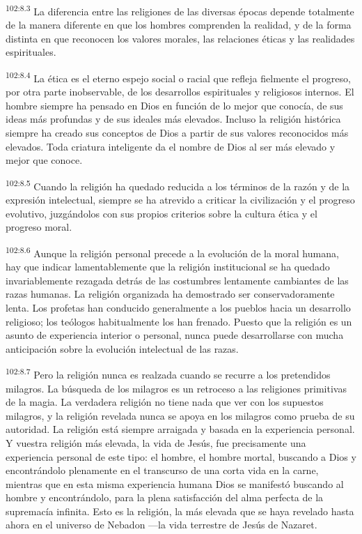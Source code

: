\documentclass[twoside, 11pt]{book}
\begin{document}
\par
\textsuperscript{102:8.3} La diferencia entre las religiones de las diversas épocas depende totalmente de la manera diferente en que los hombres comprenden la realidad, y de la forma distinta en que reconocen los valores morales, las relaciones éticas y las realidades espirituales.

\par
\textsuperscript{102:8.4} La ética es el eterno espejo social o racial que refleja fielmente el progreso, por otra parte inobservable, de los desarrollos espirituales y religiosos internos. El hombre siempre ha pensado en Dios en función de lo mejor que conocía, de sus ideas más profundas y de sus ideales más elevados. Incluso la religión histórica siempre ha creado sus conceptos de Dios a partir de sus valores reconocidos más elevados. Toda criatura inteligente da el nombre de Dios al ser más elevado y mejor que conoce.

\par
\textsuperscript{102:8.5} Cuando la religión ha quedado reducida a los términos de la razón y de la expresión intelectual, siempre se ha atrevido a criticar la civilización y el progreso evolutivo, juzgándolos con sus propios criterios sobre la cultura ética y el progreso moral.

\par
\textsuperscript{102:8.6} Aunque la religión personal precede a la evolución de la moral humana, hay que indicar lamentablemente que la religión institucional se ha quedado invariablemente rezagada detrás de las costumbres lentamente cambiantes de las razas humanas. La religión organizada ha demostrado ser conservadoramente lenta. Los profetas han conducido generalmente a los pueblos hacia un desarrollo religioso; los teólogos habitualmente los han frenado. Puesto que la religión es un asunto de experiencia interior o personal, nunca puede desarrollarse con mucha anticipación sobre la evolución intelectual de las razas.

\par
\textsuperscript{102:8.7} Pero la religión nunca es realzada cuando se recurre a los pretendidos milagros. La búsqueda de los milagros es un retroceso a las religiones primitivas de la magia. La verdadera religión no tiene nada que ver con los supuestos milagros, y la religión revelada nunca se apoya en los milagros como prueba de su autoridad. La religión está siempre arraigada y basada en la experiencia personal. Y vuestra religión más elevada, la vida de Jesús, fue precisamente una experiencia personal de este tipo: el hombre, el hombre mortal, buscando a Dios y encontrándolo plenamente en el transcurso de una corta vida en la carne, mientras que en esta misma experiencia humana Dios se manifestó buscando al hombre y encontrándolo, para la plena satisfacción del alma perfecta de la supremacía infinita. Esto es la religión, la más elevada que se haya revelado hasta ahora en el universo de Nebadon ---la vida terrestre de Jesús de Nazaret.
\end{document}
